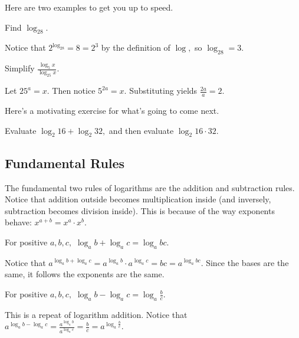 \documentclass[blue,onecol]{shooting}
\begin{document}
Here are two examples to get you up to speed.

\begin{exam}
Find $\log_28.$
\end{exam}

\begin{sol} Notice that $2^{\log_28}=8=2^3$ by the definition of $\log,$ so $\log_28=3.$\end{sol}
    
\begin{exam}
Simplify $\frac{\log_5x}{\log_{25}x}.$
\end{exam}
    
\begin{sol}
Let $25^a=x.$ Then notice $5^{2a}=x.$ Substituting yields $\frac{2a}{a}=2.$
\end{sol}

Here's a motivating exercise for what's going to come next.

\begin{exer}
Evaluate $\log_2{16}+\log_2{32},$ and then evaluate $\log_2{16\cdot 32}.$
\end{exer}

\subsection{Fundamental Rules}
The fundamental two rules of logarithms are the addition and subtraction rules. Notice that addition outside becomes multiplication inside (and inversely, subtraction becomes division inside). This is because of the way exponents behave: $x^{a+b}=x^a\cdot x^b.$

\begin{theo}
For positive $a,b,c,$ $\log_{a}b+\log_{a}c=\log_{a}{bc}.$
\end{theo}

\begin{pro}
Notice that $a^{\log_ab+\log_ac}=a^{\log_ab}\cdot a^{\log_ac}=bc=a^{\log_abc}.$ Since the bases are the same, it follows the exponents are the same.
\end{pro}

\begin{theo}
For positive $a,b,c,$ $\log_{a}b-\log_{a}c=\log_{a}{\frac{b}{c}}.$
\end{theo}

\begin{pro}
This is a repeat of logarithm addition. Notice that $a^{\log_ab-\log_ac}=\frac{a^{\log_ab}}{ a^{\log_ac}}=\frac{b}{c}=a^{\log_a\frac{b}{c}}.$
\end{pro}
\end{document}
